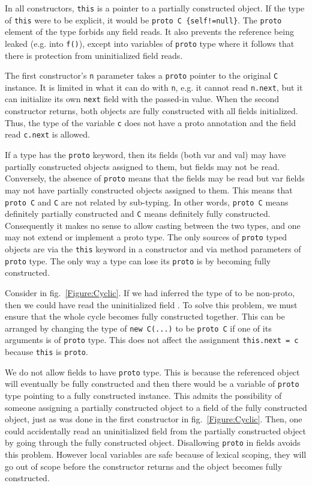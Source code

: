 In all constructors, \texttt{this} is a pointer to a partially
    constructed object.
If the type of \texttt{this} were to be explicit, it would
be \texttt{proto C \{self!=null\}}.  The \texttt{proto} element of the type
forbids any field reads.  It also prevents the reference being leaked (e.g.
into \texttt{f()}), except into variables of \texttt{proto} type where it
follows that there is protection from uninitialized field reads.

The first constructor's \texttt{n} parameter takes a \texttt{proto} pointer
to the original \texttt{C} instance.  It is limited in what it can do with
\texttt{n}, e.g. it cannot read \texttt{n.next}, but it can initialize its own
\texttt{next} field with the passed-in value.
When the second constructor returns, both objects are fully constructed with
all fields initialized.  Thus, the type of the variable \texttt{c} does not
have a proto annotation and the field read \texttt{c.next} is allowed.

If a type has the \texttt{proto} keyword, then its fields (both var and val)
may have partially constructed objects assigned to them, but fields may not be
read.  Conversely, the absence of \texttt{proto} means that the fields may be
read but var fields may not have partially constructed objects assigned to them.
This means that \texttt{proto C} and \texttt{C} are not related by sub-typing.
In other words, \texttt{proto C} means definitely partially constructed and
\texttt{C} means definitely fully constructed.  Consequently it makes no sense
to allow casting between the two types, and one may not extend or implement a
proto type.  The only sources of \texttt{proto} typed objects are via the
\texttt{this} keyword in a constructor and via method parameters of
\texttt{proto} type.  The only way a type can lose its \texttt{proto} is by
becoming fully constructed.

Consider  in fig.~\ref{Figure:Cyclic}.
If we had inferred the type of  to be non-proto,
    then we could have read the uninitialized field .
To solve this problem, we must ensure that the whole cycle becomes fully
constructed together.
This can be arranged by changing the type of \texttt{new
C(...)} to be \texttt{proto C} if one of its arguments is of \texttt{proto}
type.  This does not affect the assignment \texttt{this.next = c} because
\texttt{this} is \texttt{proto}.

We do not allow fields to have \texttt{proto} type.  This is because the
referenced object will eventually be fully constructed and then there would be
a variable of \texttt{proto} type pointing to a fully constructed instance.
This admits the possibility of someone assigning a partially constructed object
to a field of the fully constructed object, just as was done in the first
constructor in fig.~\ref{Figure:Cyclic}.  Then, one could accidentally read an
uninitialized field from the partially constructed object by going through the
fully constructed object.  Disallowing \texttt{proto} in fields avoids this
problem.  However local variables are safe because of lexical scoping, they
will go out of scope before the constructor returns and the object becomes
fully constructed.

